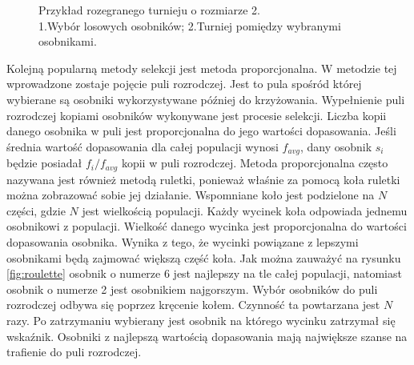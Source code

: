 \documentclass[twoside]{iisthesis}
\begin{document}
\begin{figure}[!htb]
	\centering
	\caption{Przykład rozegranego turnieju o rozmiarze 2.\\1.Wybór losowych osobników; 2.Turniej pomiędzy wybranymi osobnikami.}
	\label{fig:tournament}
\end{figure}

Kolejną popularną metody selekcji jest metoda proporcjonalna\cite{book}. W metodzie tej wprowadzone zostaje pojęcie puli rozrodczej. Jest to pula spośród której wybierane są osobniki wykorzystywane później do krzyżowania. Wypełnienie puli rozrodczej kopiami osobników wykonywane jest procesie selekcji. Liczba kopii danego osobnika w puli jest proporcjonalna do jego wartości dopasowania. Jeśli średnia wartość dopasowania dla całej populacji wynosi $f_{avg}$, dany osobnik $s_{i}$ będzie posiadał $f_{i}/f_{avg}$ kopii w puli rozrodczej. Metoda proporcjonalna często nazywana jest również metodą ruletki, ponieważ właśnie za pomocą koła ruletki można zobrazować sobie jej działanie. Wspomniane koło jest podzielone na $N$ części, gdzie $N$ jest wielkością populacji. Każdy wycinek koła odpowiada jednemu osobnikowi z populacji. Wielkość danego wycinka jest proporcjonalna do wartości dopasowania osobnika. Wynika z tego, że wycinki powiązane z lepszymi osobnikami będą zajmować większą część koła. Jak można zauważyć na rysunku \eqref{fig:roulette} osobnik o numerze 6 jest najlepszy na tle całej populacji, natomiast osobnik o numerze 2 jest osobnikiem najgorszym. Wybór osobników do puli rozrodczej odbywa się poprzez kręcenie kołem. Czynność ta powtarzana jest $N$ razy. Po zatrzymaniu wybierany jest osobnik na którego wycinku zatrzymał się wskaźnik. Osobniki z najlepszą wartością dopasowania mają największe szanse na trafienie do puli rozrodczej.
\end{document}
